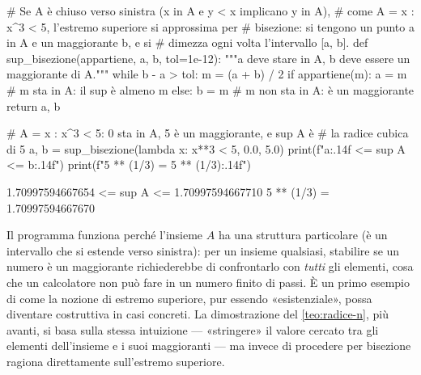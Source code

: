 \begin{python}
# Se A è chiuso verso sinistra (x in A e y < x implicano y in A),
# come A = {x : x^3 < 5}, l'estremo superiore si approssima per
# bisezione: si tengono un punto a in A e un maggiorante b, e si
# dimezza ogni volta l'intervallo [a, b].
def sup_bisezione(appartiene, a, b, tol=1e-12):
    """a deve stare in A, b deve essere un maggiorante di A."""
    while b - a > tol:
        m = (a + b) / 2
        if appartiene(m):
            a = m          # m sta in A: il sup è almeno m
        else:
            b = m          # m non sta in A: è un maggiorante
    return a, b

# A = {x : x^3 < 5}: 0 sta in A, 5 è un maggiorante, e sup A è
# la radice cubica di 5
a, b = sup_bisezione(lambda x: x**3 < 5, 0.0, 5.0)
print(f"{a:.14f} <= sup A <= {b:.14f}")
print(f"5 ** (1/3) = {5 ** (1/3):.14f}")
\end{python}
\begin{risultato}
1.70997594667654 <= sup A <= 1.70997594667710
5 ** (1/3) = 1.70997594667670
\end{risultato}

Il programma funziona perché l'insieme $A$ ha una struttura particolare (è un intervallo
che si estende verso sinistra): per un insieme qualsiasi, stabilire se un numero è un
maggiorante richiederebbe di confrontarlo con \emph{tutti} gli elementi, cosa che un
calcolatore non può fare in un numero finito di passi. È un primo esempio di come la
nozione di estremo superiore, pur essendo «esistenziale», possa diventare costruttiva in
casi concreti. La dimostrazione del \cref{teo:radice-n}, più avanti, si basa sulla stessa
intuizione --- «stringere» il valore cercato tra gli elementi dell'insieme e i suoi
maggioranti --- ma invece di procedere per bisezione ragiona direttamente sull'estremo
superiore.
